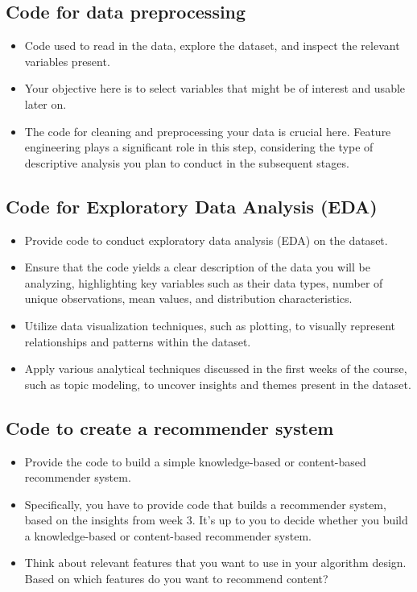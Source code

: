 \subsection{Code for data preprocessing}
\begin{itemize}
	\item Code used to read in the data, explore the dataset, and inspect the relevant variables present.
	\item Your objective here is to select variables that might be of interest and usable later on.
	\item The code for cleaning and preprocessing your data is crucial here. Feature engineering plays a significant role in this step, considering the type of descriptive analysis you plan to conduct in the subsequent stages.
\end{itemize}

\subsection{Code for Exploratory Data Analysis (EDA)}
\begin{itemize}
\item Provide code to conduct exploratory data analysis (EDA) on the dataset.
\item Ensure that the code yields a clear description of the data you will be analyzing, highlighting key variables such as their data types, number of unique observations, mean values, and distribution characteristics.
\item Utilize data visualization techniques, such as plotting, to visually represent relationships and patterns within the dataset.
\item Apply various analytical techniques discussed in the first weeks of the course, such as topic modeling, to uncover insights and themes present in the dataset.
\end{itemize}

\subsection{Code to create a recommender system}

\begin{itemize}
	\item Provide the code to build a simple knowledge-based or content-based recommender system. 
	\item Specifically, you have to provide code that builds a recommender system, based on the insights from week 3. It's up to you to decide whether you build a knowledge-based or content-based recommender system.
	\item Think about relevant features that you want to use in your algorithm design. Based on which features do you want to recommend content?
\end{itemize}

